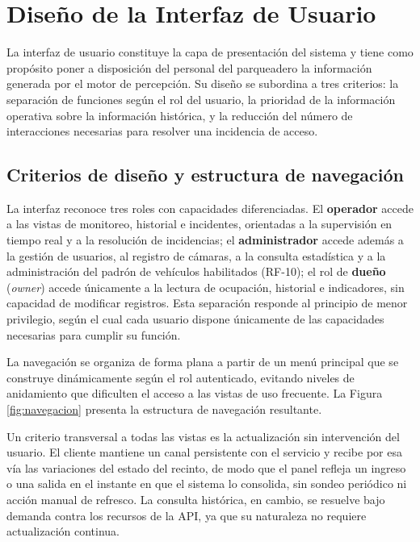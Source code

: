 \section{Diseño de la Interfaz de Usuario}

La interfaz de usuario constituye la capa de presentación del sistema y tiene
como propósito poner a disposición del personal del parqueadero la información
generada por el motor de percepción. Su diseño se subordina a tres criterios: la
separación de funciones según el rol del usuario, la prioridad de la información
operativa sobre la información histórica, y la reducción del número de
interacciones necesarias para resolver una incidencia de acceso.

\subsection{Criterios de diseño y estructura de navegación}

La interfaz reconoce tres roles con capacidades diferenciadas. El
\textbf{operador} accede a las vistas de monitoreo, historial e incidentes,
orientadas a la supervisión en tiempo real y a la resolución de incidencias; el
\textbf{administrador} accede además a la gestión de usuarios, al registro de
cámaras, a la consulta estadística y a la administración del padrón de
vehículos habilitados (RF-10); el rol de
\textbf{dueño} (\textit{owner}) accede únicamente a la lectura de ocupación,
historial e indicadores, sin capacidad de modificar registros. Esta
separación responde al principio de menor privilegio, según el cual cada usuario
dispone únicamente de las capacidades necesarias para cumplir su función.

La navegación se organiza de forma plana a partir de un menú principal que se
construye dinámicamente según el rol autenticado, evitando niveles de anidamiento
que dificulten el acceso a las vistas de uso frecuente. La Figura
\ref{fig:navegacion} presenta la estructura de navegación resultante.

Un criterio transversal a todas las vistas es la actualización sin intervención
del usuario. El cliente mantiene un canal persistente con el servicio y recibe
por esa vía las variaciones del estado del recinto, de modo que el panel refleja
un ingreso o una salida en el instante en que el sistema lo consolida, sin
sondeo periódico ni acción manual de refresco. La consulta histórica, en cambio,
se resuelve bajo demanda contra los recursos de la API, ya que su naturaleza no
requiere actualización continua.

